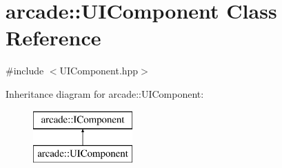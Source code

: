 \hypertarget{classarcade_1_1_u_i_component}{}\section{arcade\+:\+:U\+I\+Component Class Reference}
\label{classarcade_1_1_u_i_component}


{\ttfamily \#include $<$U\+I\+Component.\+hpp$>$}

Inheritance diagram for arcade\+:\+:U\+I\+Component\+:\begin{figure}[H]
\begin{center}
\leavevmode
\includegraphics[height=2.000000cm]{classarcade_1_1_u_i_component}
\end{center}
\end{figure}
